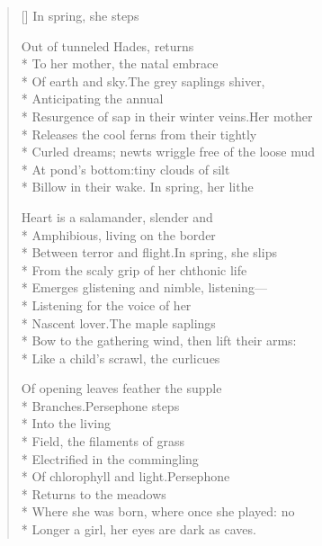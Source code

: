 \begingroup
{}
\label{ch:by_the_laughless_rock}
\settowidth{\versewidth}{Resurgence of sap in their winter veins.\quad Her mother}
\begin{verse}[\versewidth]
\hspace{3\vgap} In spring, she steps

Out of tunneled Hades, returns\\*
To her mother, the natal embrace\\*
Of earth and sky.\quad The grey saplings shiver,\\*
Anticipating the annual\\*
Resurgence of sap in their winter veins.\quad Her mother\\*
Releases the cool ferns from their tightly\\*
Curled dreams; newts wriggle free of the loose mud\\*
At pond's bottom:\quad tiny clouds of silt\\*
Billow in their wake.  In spring, her lithe

Heart is a salamander, slender and\\*
Amphibious, living on the border\\*
Between terror and flight.\quad In spring, she slips\\*
From the scaly grip of her chthonic life\\*
Emerges glistening and nimble, listening---\\*
Listening for the voice of her\\*
Nascent lover.\quad The maple saplings\\*
Bow to the gathering wind,    then lift their arms:\\*
Like a child's scrawl, the curlicues

Of opening leaves feather the supple\\*
Branches.\quad Persephone steps\\*
Into the living\\*
Field, the filaments of grass\\*
Electrified in the commingling\\*
Of chlorophyll and light.\quad Persephone\\*
Returns to the meadows\\*
Where she was born, where once she played: no\\*
Longer a girl, her eyes are dark as caves.
\end{verse}

\renewcommand{\poemtoc}{subsection}
\clearpage

